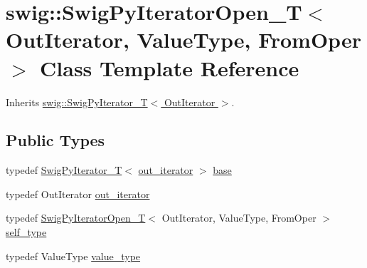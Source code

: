 \hypertarget{classswig_1_1_swig_py_iterator_open___t}{}\section{swig\+:\+:Swig\+Py\+Iterator\+Open\+\_\+T$<$ Out\+Iterator, Value\+Type, From\+Oper $>$ Class Template Reference}
\label{classswig_1_1_swig_py_iterator_open___t}


Inherits \hyperlink{classswig_1_1_swig_py_iterator___t}{swig\+::\+Swig\+Py\+Iterator\+\_\+\+T$<$ Out\+Iterator $>$}.

\subsection*{Public Types}
\begin{DoxyCompactItemize}
\item 
typedef \hyperlink{classswig_1_1_swig_py_iterator___t}{Swig\+Py\+Iterator\+\_\+T}$<$ \hyperlink{classswig_1_1_swig_py_iterator___t_aec35545038c3d804975a147253f061e4}{out\+\_\+iterator} $>$ \hyperlink{classswig_1_1_swig_py_iterator_open___t_acee28cc32d3d9a19f711bd9df933b06c}{base}
\item 
typedef Out\+Iterator \hyperlink{classswig_1_1_swig_py_iterator_open___t_ad348022c40678f2217e0696c8b6bb59b}{out\+\_\+iterator}
\item 
typedef \hyperlink{classswig_1_1_swig_py_iterator_open___t}{Swig\+Py\+Iterator\+Open\+\_\+T}$<$ Out\+Iterator, Value\+Type, From\+Oper $>$ \hyperlink{classswig_1_1_swig_py_iterator_open___t_a232561380f04d1a22f772e24d6ff38e5}{self\+\_\+type}
\item 
typedef Value\+Type \hyperlink{classswig_1_1_swig_py_iterator_open___t_ac5d08f0ecc1d014a83632411678103f3}{value\+\_\+type}
\end{DoxyCompactItemize}
